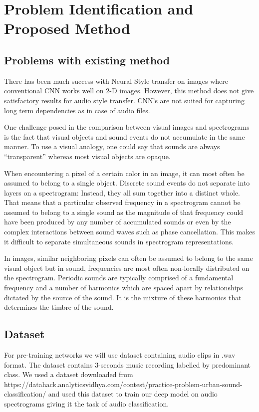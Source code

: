 \documentclass[10pt,twocolumn,letterpaper]{article}
\begin{document}
\section{Problem Identification and Proposed Method}
\subsection{Problems with existing method}
There has been much success with Neural Style transfer
on images where conventional CNN works well on 2-D
images. However, this method does not give satisfactory
results for audio style transfer. CNN’s are not suited for
capturing long term dependencies as in case of audio files.

One challenge posed in the comparison between visual images and spectrograms is the fact that visual objects and sound events do not accumulate in the same manner. To use a visual analogy, one could say that sounds are always “transparent” whereas most visual objects are opaque.

When encountering a pixel of a certain color in an image, it can most often be assumed to belong to a single object. Discrete sound events do not separate into layers on a spectrogram: Instead, they all sum together into a distinct whole. That means that a particular observed frequency in a spectrogram cannot be assumed to belong to a single sound as the magnitude of that frequency could have been produced by any number of accumulated sounds or even by the complex interactions between sound waves such as phase cancellation. This makes it difficult to separate simultaneous sounds in spectrogram representations.

In images, similar neighboring pixels can often be assumed to belong to the same visual object but in sound, frequencies are most often non-locally distributed on the spectrogram. Periodic sounds are typically comprised of a fundamental frequency and a number of harmonics which are spaced apart by relationships dictated by the source of the sound. It is the mixture of these harmonics that determines the timbre of the sound.

\subsection{Dataset}
For pre-training networks we will use dataset containing audio clips in .wav format. The dataset  contains 3-seconds music recording labelled by predominant class. We used a dataset downloaded from https://datahack.analyticsvidhya.com/contest/practice-problem-urban-sound-classification/ and used this dataset to train our deep model on audio spectrograms giving it the task of audio classification.
\end{document}
